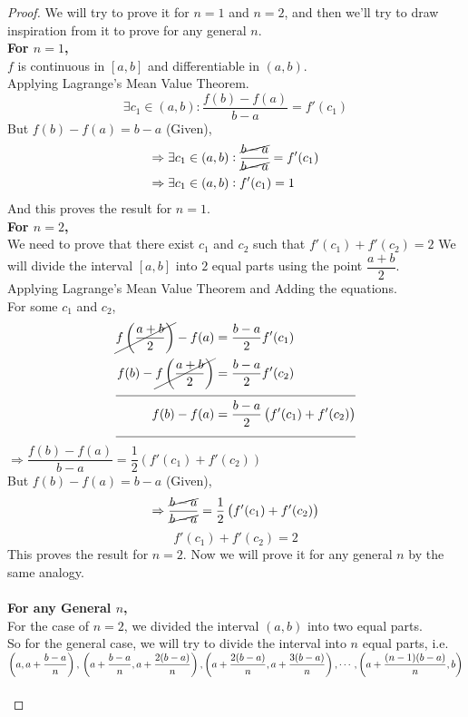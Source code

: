 \documentclass[14]{article}
\theoremstyle{definition}
\begin{document}
\begin{proof}
We will try to prove it for $n = 1$ and $n = 2$, and then we'll try to draw inspiration from it to prove for any general $n$.\\
\textbf{For $n = 1$,}\\
$f$ is continuous in $[a, b]$ and differentiable in $(a, b)$.\\
Applying Lagrange's Mean Value Theorem.\\
\[
\exists c_1 \in (a, b) : \dfrac{f(b) - f(a)}{b - a} = f'(c_1)
\]
But $f(b) - f(a) = b - a$ (Given),
\begin{align*}
\Rightarrow\exists c_1 \in (a, b) &: \dfrac{\cancel{b - a}}{\cancel{b - a}} = f'(c_1)\\
\Rightarrow\exists c_1 \in (a, b) &: f'(c_1) = 1
\end{align*}
And this proves the result for $n = 1$.\\
\textbf{For $n = 2$,}\\
We need to prove that there exist $c_1$ and $c_2$ such that $f'(c_1) + f'(c_2) = 2$
We will divide the interval $[a, b]$ into $2$ equal parts using the point $\dfrac{a + b}{2}$.\\
Applying Lagrange's Mean Value Theorem and Adding the equations.\\
For some $c_1$ and $c_2$,
\begin{align*}
\cancel{f\left(\dfrac{a+b}{2}\right)} - f(a) &= \dfrac{b-a}{2} f'(c_1)\\
f(b) - \cancel{f\left(\dfrac{a+b}{2}\right)} &= \dfrac{b - a }{2} f'(c_2)\\
\cline{0-1}
f(b) - f(a) &= \dfrac{b - a}{2} \left(f'(c_1) + f'(c_2)\right)\\
\cline{0-1}
\end{align*}
$\Rightarrow \dfrac{f(b) - f(a)}{b - a} = \dfrac12 \left(f'(c_1) + f'(c_2)\right)$\\
But $f(b) - f(a) = b - a$ (Given),
\[\Rightarrow \dfrac{\cancel{b - a}}{\cancel{b - a}} = \dfrac12 \left(f'(c_1) + f'(c_2)\right) \]
\[f'(c_1) + f'(c_2) = 2\]
This proves the result for $n = 2$.
\pagebreak
Now we will prove it for any general $n$ by the same analogy.\\\\
\textbf{For any General $n$,}\\
For the case of $n = 2$, we divided the interval $(a, b)$ into two equal parts.\\
So for the general case, we will try to divide the interval into $n$ equal parts, i.e. $\left(a, a + \dfrac{b - a}{n}\right),\\ \left(a + \dfrac{b - a}{n}, a + \dfrac{2(b - a)}{n}\right), \left(a + \dfrac{2(b - a)}{n}, a + \dfrac{3(b - a)}{n}\right), \cdots, \left(a + \dfrac{(n-1)(b - a)}{n}, b\right)$\\\\

\end{proof}
\end{document}

